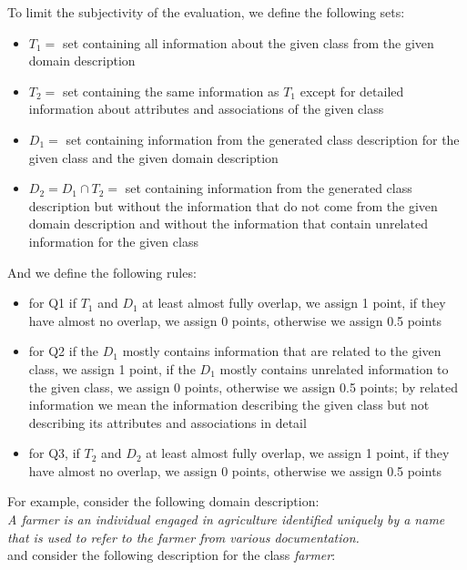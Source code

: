 \noindent{}To limit the subjectivity of the evaluation, we define the following sets:

\begin{itemize}
\item $T_1 =$ set containing all information about the given class from the given domain description
\item $T_2 =$ set containing the same information as $T_1$ except for detailed information about attributes and associations of the given class
\item $D_1 =$ set containing information from the generated class description for the given class and the given domain description
\item $D_2 = D_1 \cap T_2 =$ set containing information from the generated class description but without the information that do not come from the given domain description and without the information that contain unrelated information for the given class
\end{itemize}

\noindent{}And we define the following rules:
\begin{itemize}
\item for Q1 if $T_1$ and $D_1$ at least almost fully overlap, we assign 1 point, if they have almost no overlap, we assign 0 points, otherwise we assign 0.5 points
\item for Q2 if the $D_1$ mostly contains information that are related to the given class, we assign 1 point, if the $D_1$ mostly contains unrelated information to the given class, we assign 0 points, otherwise we assign 0.5 points; by related information we mean the information describing the given class but not describing its attributes and associations in detail
\item for Q3, if $T_2$ and $D_2$ at least almost fully overlap, we assign 1 point, if they have almost no overlap, we assign 0 points, otherwise we assign 0.5 points
\end{itemize}


\noindent{}For example, consider the following domain description: \\

\noindent{}\textit{A farmer is an individual engaged in agriculture identified uniquely by a name that is used to refer to the farmer from various documentation.} \\

\noindent{}and consider the following description for the class \textit{farmer}: \\

